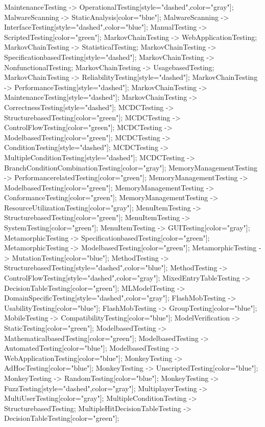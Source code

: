 \documentclass{article}
\begin{document}
{MaintenanceTesting -> OperationalTesting[style="dashed",color="gray"];
MalwareScanning -> StaticAnalysis[color="blue"];
MalwareScanning -> InterfaceTesting[style="dashed",color="blue"];
ManualTesting -> ScriptedTesting[color="green"];
MarkovChainTesting -> WebApplicationTesting;
MarkovChainTesting -> StatisticalTesting;
MarkovChainTesting -> SpecificationbasedTesting[style="dashed"];
MarkovChainTesting -> NonfunctionalTesting;
MarkovChainTesting -> UsagebasedTesting;
MarkovChainTesting -> ReliabilityTesting[style="dashed"];
MarkovChainTesting -> PerformanceTesting[style="dashed"];
MarkovChainTesting -> MaintenanceTesting[style="dashed"];
MarkovChainTesting -> CorrectnessTesting[style="dashed"];
MCDCTesting -> StructurebasedTesting[color="green"];
MCDCTesting -> ControlFlowTesting[color="green"];
MCDCTesting -> ModelbasedTesting[color="green"];
MCDCTesting -> ConditionTesting[style="dashed"];
MCDCTesting -> MultipleConditionTesting[style="dashed"];
MCDCTesting -> BranchConditionCombinationTesting[color="gray"];
MemoryManagementTesting -> PerformancerelatedTesting[color="green"];
MemoryManagementTesting -> ModelbasedTesting[color="green"];
MemoryManagementTesting -> ConformanceTesting[color="green"];
MemoryManagementTesting -> ResourceUtilizationTesting[color="gray"];
MenuItemTesting -> StructurebasedTesting[color="green"];
MenuItemTesting -> SystemTesting[color="green"];
MenuItemTesting -> GUITesting[color="gray"];
MetamorphicTesting -> SpecificationbasedTesting[color="green"];
MetamorphicTesting -> ModelbasedTesting[color="green"];
MetamorphicTesting -> MutationTesting[color="blue"];
MethodTesting -> StructurebasedTesting[style="dashed",color="blue"];
MethodTesting -> ControlFlowTesting[style="dashed",color="gray"];
MixedEntryTableTesting -> DecisionTableTesting[color="green"];
MLModelTesting -> DomainSpecificTesting[style="dashed",color="gray"];
FlashMobTesting -> UsabilityTesting[color="blue"];
FlashMobTesting -> GroupTesting[color="blue"];
MobileTesting -> CompatibilityTesting[color="blue"];
ModelVerification -> StaticTesting[color="green"];
ModelbasedTesting -> MathematicalbasedTesting[color="green"];
ModelbasedTesting -> AutomatedTesting[color="blue"];
ModelbasedTesting -> WebApplicationTesting[color="blue"];
MonkeyTesting -> AdHocTesting[color="blue"];
MonkeyTesting -> UnscriptedTesting[color="blue"];
MonkeyTesting -> RandomTesting[color="blue"];
MonkeyTesting -> FuzzTesting[style="dashed",color="gray"];
MultiplayerTesting -> MultiUserTesting[color="gray"];
MultipleConditionTesting -> StructurebasedTesting;
MultipleHitDecisionTableTesting -> DecisionTableTesting[color="green"];
}
\end{document}
